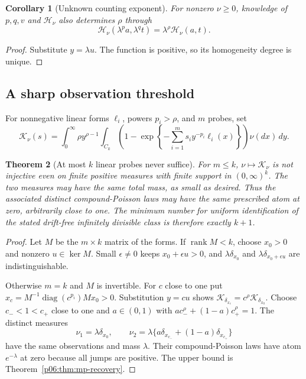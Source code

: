 \documentclass[11pt,letterpaper]{article}
\newtheorem{theorem}{Theorem}[section]
\newtheorem{corollary}[theorem]{Corollary}
\theoremstyle{definition}
\theoremstyle{remark}
\newcommand{\1}{\mathbf 1}
\begin{document}
\begin{corollary}[Unknown counting exponent]\label{p06:cor:mp-rho}
For nonzero $\nu\ge0$, knowledge of $p,q,v$ and $\mathcal H_\nu$
also determines $\rho$ through
\[
 \mathcal H_\nu(\lambda^p a,\lambda^q t)
       =\lambda^\rho\mathcal H_\nu(a,t).
\]
\end{corollary}
\begin{proof}
Substitute $y=\lambda u$. The function is positive, so its
homogeneity degree is unique.
\end{proof}

\subsection{A sharp observation threshold}

For nonnegative linear forms $\ell_i$, powers $p_i>\rho$, and
$m$ probes, set
\begin{equation}\label{p06:eq:mp-general-design}
 \mathcal K_\nu(s)=
 \int_0^\infty\!\rho y^{\rho-1}
 \int_{C_k}\!\left(1-\exp\left\{-\sum_{i=1}^m
       s_i y^{-p_i}\ell_i(x)\right\}\right)\nu(dx)\,dy.
\end{equation}

\begin{theorem}[At most $k$ linear probes never suffice]
\label{p06:thm:mp-minimality}
For $m\le k$, $\nu\mapsto\mathcal K_\nu$ is not injective even
on finite positive measures with finite support in $(0,\infty)^k$.
The two measures may have the same total mass, as small as desired.
Thus the associated distinct compound-Poisson laws may have the
same prescribed atom at zero, arbitrarily close to one.
The minimum number for uniform identification of the stated
drift-free infinitely divisible class is therefore exactly $k+1$.
\end{theorem}
\begin{proof}
Let $M$ be the $m\times k$ matrix of the forms.
If $\operatorname{rank}M<k$, choose $x_0>0$ and nonzero
$u\in\ker M$. Small $\epsilon\ne0$ keeps $x_0+\epsilon u>0$,
and $\lambda\delta_{x_0}$ and
$\lambda\delta_{x_0+\epsilon u}$ are indistinguishable.

Otherwise $m=k$ and $M$ is invertible. For $c$ close to one put
$x_c=M^{-1}\operatorname{diag}(c^{p_i})Mx_0>0$.
Substitution $y=cu$ shows
$\mathcal K_{\delta_{x_c}}=c^\rho\mathcal K_{\delta_{x_0}}$.
Choose $c_-<1<c_+$ close to one and $a\in(0,1)$ with
$ac_-^\rho+(1-a)c_+^\rho=1$. The distinct measures
\[
 \nu_1=\lambda\delta_{x_0},\qquad
 \nu_2=\lambda\{a\delta_{x_{c_-}}+(1-a)\delta_{x_{c_+}}\}
\]
have the same observations and mass $\lambda$. Their compound-Poisson
laws have atom $e^{-\lambda}$ at zero because all jumps are positive.
The upper bound is Theorem~\ref{p06:thm:mp-recovery}.
\end{proof}
\end{document}
